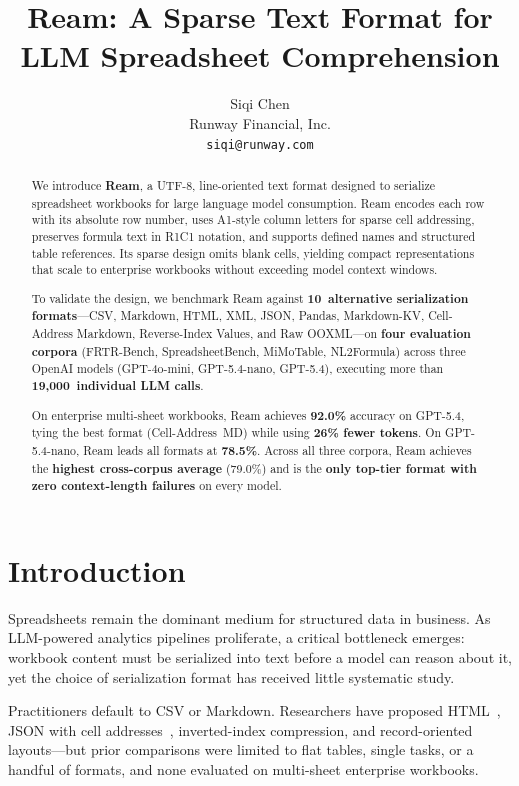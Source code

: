 \documentclass[11pt]{article}
\title{Ream: A Sparse Text Format for LLM Spreadsheet Comprehension}
\author{Siqi Chen\\
Runway Financial, Inc.\\
\texttt{siqi@runway.com}}
\date{}
\begin{document}
\maketitle

\begin{abstract}
We introduce \textbf{Ream}, a UTF-8, line-oriented text format designed to serialize spreadsheet workbooks for large language model consumption.
Ream encodes each row with its absolute row number, uses A1-style column letters for sparse cell addressing, preserves formula text in R1C1 notation, and supports defined names and structured table references.
Its sparse design omits blank cells, yielding compact representations that scale to enterprise workbooks without exceeding model context windows.

To validate the design, we benchmark Ream against \textbf{10~alternative serialization formats}---CSV, Markdown, HTML, XML, JSON, Pandas, Markdown-KV, Cell-Address Markdown, Reverse-Index Values, and Raw OOXML---on \textbf{four evaluation corpora} (FRTR-Bench, SpreadsheetBench, MiMoTable, NL2Formula) across three OpenAI models (GPT-4o-mini, GPT-5.4-nano, GPT-5.4), executing more than \textbf{19,000~individual LLM calls}.

On enterprise multi-sheet workbooks, Ream achieves \textbf{92.0\%} accuracy on GPT-5.4, tying the best format (Cell-Address~MD) while using \textbf{26\% fewer tokens}.
On GPT-5.4-nano, Ream leads all formats at \textbf{78.5\%}.
Across all three corpora, Ream achieves the \textbf{highest cross-corpus average} (79.0\%) and is the \textbf{only top-tier format with zero context-length failures} on every model.
\end{abstract}

\section{Introduction}
\label{sec:intro}

Spreadsheets remain the dominant medium for structured data in business.
As LLM-powered analytics pipelines proliferate, a critical bottleneck emerges: workbook content must be serialized into text before a model can reason about it, yet the choice of serialization format has received little systematic study.

Practitioners default to CSV or Markdown.
Researchers have proposed HTML~\citep{sui2024table}, JSON with cell addresses~\citep{dong2024spreadsheetllm}, inverted-index compression, and record-oriented layouts---but prior comparisons were limited to flat tables, single tasks, or a handful of formats, and none evaluated on multi-sheet enterprise workbooks.
\end{document}
